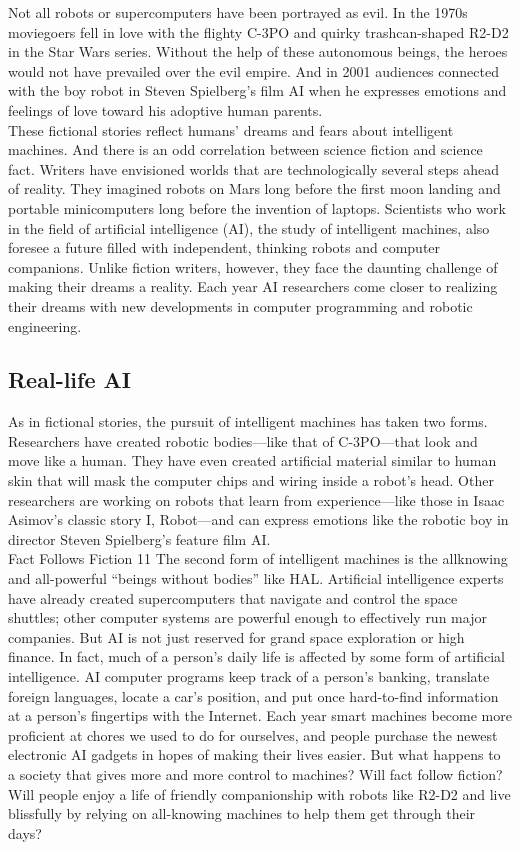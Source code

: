 \documentclass[12pt]{article}
\begin{document}
Not all robots or supercomputers have been portrayed as evil. In the 1970s moviegoers fell in love with the flighty C-3PO and quirky trashcan-shaped R2-D2 in the Star Wars series. Without the help of these autonomous beings, the heroes would not have prevailed over the evil empire. And in 2001 audiences connected with the boy robot in Steven Spielberg’s film AI when he expresses emotions and feelings of love toward his adoptive human parents.\\
 These fictional stories reflect humans’ dreams and fears about intelligent machines. And there is an odd correlation between science fiction and science fact. Writers have envisioned worlds that are technologically several steps ahead of reality. They imagined robots on Mars long before the first moon landing and portable minicomputers long before the invention of laptops. Scientists who work in the field of artificial intelligence (AI), the study of intelligent machines, also foresee a future filled with independent, thinking robots and computer companions. Unlike fiction writers, however, they face the daunting challenge of making their dreams a reality. Each year AI researchers come closer to realizing their dreams with new developments in computer programming and robotic engineering.\\ 
\huge\subsection{Real-life AI}
\large\flushleft
 As in fictional stories, the pursuit of intelligent machines has taken two forms. Researchers have created robotic bodies—like that of C-3PO—that look and move like a human. They have even created artificial material similar to human skin that will mask the computer chips and wiring inside a robot’s head. Other researchers are working on robots that learn from experience—like those in Isaac Asimov’s classic story I, Robot—and can express emotions like the robotic boy in director Steven Spielberg’s feature film AI.\\
Fact Follows Fiction 11
The second form of intelligent machines is the allknowing and all-powerful “beings without bodies” like HAL. Artificial intelligence experts have already created supercomputers that navigate and control the space shuttles; other computer systems are powerful enough to effectively run major companies. But AI is not just reserved for grand space exploration or high finance. In fact, much of a person’s daily life is affected by some form of artificial intelligence. AI computer programs keep track of a person’s banking, translate foreign languages, locate a car’s position, and put once hard-to-find information at a person’s fingertips with the Internet. Each year smart machines become more proficient at chores we used to do for ourselves, and people purchase the newest electronic AI gadgets in hopes of making their lives easier. But what happens to a society that gives more and more control to machines? Will fact follow fiction? Will people enjoy a life of friendly companionship with robots like R2-D2 and live blissfully by relying on all-knowing machines to help them get through their days?\\
\end{document}
